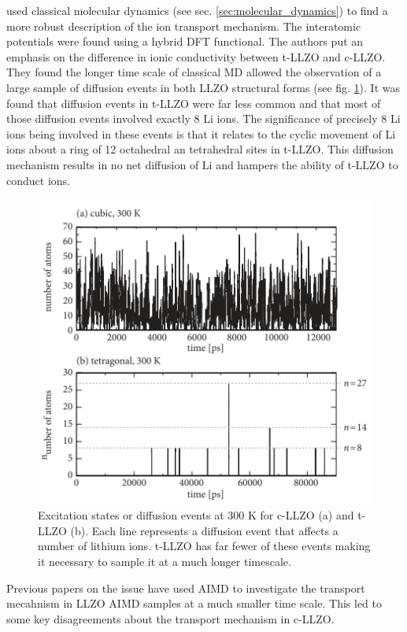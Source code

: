 \documentclass[../main.tex]{subfiles}
\begin{document}
\citeauthor{Burbano2016} used classical molecular dynamics (see sec. \ref{sec:molecular_dynamics}) to find a more robust description of the ion transport mechanism.\cite{Burbano2016} The interatomic potentials were found using a hybrid DFT functional. The authors put an emphasis on the difference in ionic conductivity between t-LLZO and c-LLZO. They found the longer time scale of classical MD allowed the observation of a large sample of diffusion events in both LLZO structural forms (see fig. \ref{fig:burbano_diffusion}). It was found that diffusion events in t-LLZO were far less common and that most of those diffusion events involved exactly 8 Li ions. The significance of precisely 8 Li ions being involved in these events is that it relates to the cyclic movement of Li ions about a ring of 12 octahedral an tetrahedral sites in t-LLZO. This diffusion mechanism results in no net diffusion of Li and hampers the ability of t-LLZO to conduct ions. 

\begin{figure}[h]
    \centering
    \includegraphics[scale=1]{figures/burbano_diffusion_events.png}
    \caption{Excitation states or diffusion events at 300 K for c-LLZO (a) and t-LLZO (b). Each line represents a diffusion event that affects a number of lithium ions. t-LLZO has far fewer of these events making it necessary to sample it at a much longer timescale. }
    \label{fig:burbano_diffusion}
\end{figure}

Previous papers on the issue have used AIMD to investigate the transport mecahnism in LLZO
AIMD samples at a much smaller time scale. This led to some key disagreements about the transport mechanism in c-LLZO.\cite{Meier2014, Jalem2013, Burbano2016}
\end{document}
